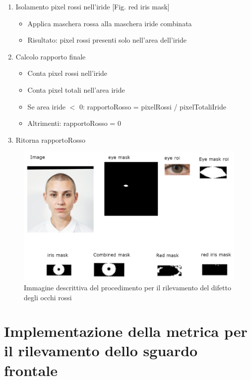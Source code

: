 \documentclass[12pt,a4paper,openright,twoside]{book}
\begin{document}
\begin{enumerate}
\begin{itemize}
\begin{itemize}
            \end{itemize}
    \end{itemize}
    \item Isolamento pixel rossi nell'iride [Fig. red iris mask] \begin{itemize}
        \item Applica maschera rossa alla maschera iride combinata
        \item Risultato: pixel rossi presenti solo nell'area dell'iride
    \end{itemize}
    \item Calcolo rapporto finale \begin{itemize}
        \item Conta pixel rossi nell'iride
        \item Conta pixel totali nell'area iride
        \item Se area iride $<$ 0: rapportoRosso = pixelRossi / pixelTotaliIride
        \item Altrimenti: rapportoRosso = 0
    \end{itemize}
    \item Ritorna rapportoRosso
\end{enumerate}
\begin{figure}
    \centering
    \includegraphics[width=1\linewidth]{figures/red-eye-process.png}
    \caption{Immagine descrittiva del procedimento per il rilevamento del difetto degli occhi rossi}
    \label{fig:red-eye-process}
\end{figure}

\chapter{Implementazione della metrica per il rilevamento dello sguardo frontale}
\label{chap:frontal_gaze_algo}
\end{document}
